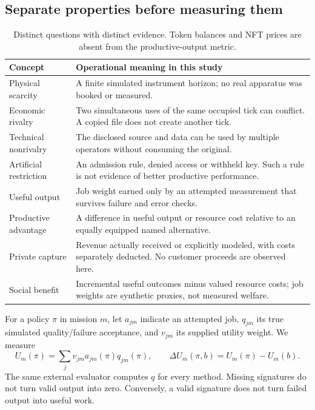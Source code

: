 \subsection{Separate properties before measuring them}
\begin{table}[H]\small\renewcommand{\arraystretch}{1.16}
\begin{tabularx}{\textwidth}{@{}p{}X@{}}\toprule
Concept & Operational meaning in this study\\\midrule
Physical scarcity & A finite simulated instrument horizon; no real apparatus was booked or measured.\\
Economic rivalry & Two simultaneous uses of the same occupied tick can conflict. A copied file does not create another tick.\\
Technical nonrivalry & The disclosed source and data can be used by multiple operators without consuming the original.\\
Artificial restriction & An admission rule, denied access or withheld key. Such a rule is not evidence of better productive performance.\\
Useful output & Job weight earned only by an attempted measurement that survives failure and error checks.\\
Productive advantage & A difference in useful output or resource cost relative to an equally equipped named alternative.\\
Private capture & Revenue actually received or explicitly modeled, with costs separately deducted. No customer proceeds are observed here.\\
Social benefit & Incremental useful outcomes minus valued resource costs; job weights are synthetic proxies, not measured welfare.\\\bottomrule
\end{tabularx}
\caption{Distinct questions with distinct evidence. Token balances and NFT prices are absent from the productive-output metric.}
\end{table}

For a policy $\pi$ in mission $m$, let $a_{jm}$ indicate an attempted job, $q_{jm}$ its true simulated quality/failure acceptance, and $v_{jm}$ its supplied utility weight. We measure
\begin{equation}
U_m(\pi)=\sum_j v_{jm}a_{jm}(\pi)q_{jm}(\pi),\qquad
\Delta U_m(\pi,b)=U_m(\pi)-U_m(b).
\end{equation}
The same external evaluator computes $q$ for every method. Missing signatures do not turn valid output into zero. Conversely, a valid signature does not turn failed output into useful work.

